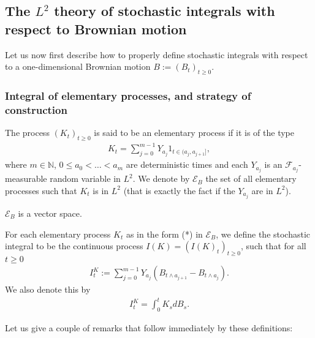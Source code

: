 \documentclass[../mainfile.tex]{subfiles}
\begin{document}
\subsection{The $L^2$ theory of stochastic integrals with respect to Brownian motion}
Let us now first describe how to properly define stochastic integrals with respect to a one-dimensional Brownian motion $B:=(B_t)_{t \geq 0}$. 
\subsubsection{Integral of elementary processes, and strategy of construction}
\begin{defn} The process $(K_t)_{t \geq 0}$ is said to be an elementary process if it is of the type 
\begin{align*}
K_t = \sum_{j=0}^{m-1} Y_{a_j} 1_{t \in (a_j,a_{j+1}]}, \tag{*}
\end{align*}
where $m \in \mathbb{N}$, $0 \leq a_0 < \dots < a_m$ are deterministic times and each $Y_{a_j}$ is an $\mathcal{F}_{a_j}$-measurable random variable in $L^2$. We denote by $\mathcal{E}_B$ the set of all elementary processes such that $K_t$ is in $L^2$ (that is exactly the fact if the $Y_{a_j}$ are in $L^2$). 
\end{defn}
\begin{rem} $\mathcal{E}_B$ is a vector space. 
\end{rem}
\begin{defn} For each elementary process $K_t$ as in the form (*) in $\mathcal{E}_B$, we define the stochastic integral to be the continuous process $I(K)=(I(K)_t)_{t \geq 0}$, such that for all $t \geq 0$
\begin{align*}
I_t^K:= \sum_{j=0}^{m-1} Y_{a_j} (B_{t \wedge a_{j+1}}-B_{t \wedge a_j}).
\end{align*}
We also denote this by
\begin{align*}
I_t^K = \int_0^t K_s dB_s.
\end{align*}
\end{defn}
\newpage
Let us give a couple of remarks that follow immediately by these definitions:
\end{document}
